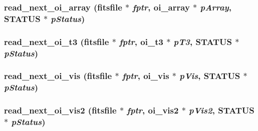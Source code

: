 \hypertarget{group__oitable_gab54477593012c35dd5330f6a4001d3f1}{
\subsubsection[{read\_\-next\_\-oi\_\-array}]{ read\_\-next\_\-oi\_\-array (fitsfile $\ast$ {\em fptr}, \/  {\bf oi\_\-array} $\ast$ {\em pArray}, \/  {\bf STATUS} $\ast$ {\em pStatus})}}
\label{group__oitable_gab54477593012c35dd5330f6a4001d3f1}
\hypertarget{group__oitable_ga09a99c8cfaefda026cbaafb8ff1cf6da}{
\subsubsection[{read\_\-next\_\-oi\_\-t3}]{ read\_\-next\_\-oi\_\-t3 (fitsfile $\ast$ {\em fptr}, \/  {\bf oi\_\-t3} $\ast$ {\em pT3}, \/  {\bf STATUS} $\ast$ {\em pStatus})}}
\label{group__oitable_ga09a99c8cfaefda026cbaafb8ff1cf6da}
\hypertarget{group__oitable_gaaf96668094b9b3c353a700e700f6d13e}{
\subsubsection[{read\_\-next\_\-oi\_\-vis}]{ read\_\-next\_\-oi\_\-vis (fitsfile $\ast$ {\em fptr}, \/  {\bf oi\_\-vis} $\ast$ {\em pVis}, \/  {\bf STATUS} $\ast$ {\em pStatus})}}
\label{group__oitable_gaaf96668094b9b3c353a700e700f6d13e}
\hypertarget{group__oitable_ga28b44f612e1d227e021ce07279956375}{
\subsubsection[{read\_\-next\_\-oi\_\-vis2}]{ read\_\-next\_\-oi\_\-vis2 (fitsfile $\ast$ {\em fptr}, \/  {\bf oi\_\-vis2} $\ast$ {\em pVis2}, \/  {\bf STATUS} $\ast$ {\em pStatus})}}
